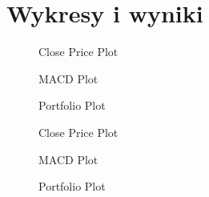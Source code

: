 \documentclass{article}
\begin{document}
    \section*{Wykresy i wyniki}

    \begin{figure}[H]
        \centering
        \makebox[\textwidth][c]{}
        \caption{Close Price Plot}
        \label{fig:close_price_1000}
    \end{figure}

    \begin{figure}[H]
        \centering
        \makebox[\textwidth][c]{}
        \caption{MACD Plot}
        \label{fig:macd_plot_1000}
    \end{figure}

    \begin{figure}[H]
        \centering
        \makebox[\textwidth][c]{}
        \caption{Portfolio Plot}
        \label{fig:portfolio_plot_1000}
    \end{figure}

     \begin{figure}[H]
        \centering
        \makebox[\textwidth][c]{}
        \caption{Close Price Plot}
        \label{fig:close_price_200}
    \end{figure}

    \begin{figure}[H]
        \centering
        \makebox[\textwidth][c]{}
        \caption{MACD Plot}
        \label{fig:macd_plot_200}
    \end{figure}

    \begin{figure}[H]
        \centering
        \makebox[\textwidth][c]{}
        \caption{Portfolio Plot}
        \label{fig:portfolio_plot_200}
    \end{figure}
\end{document}
